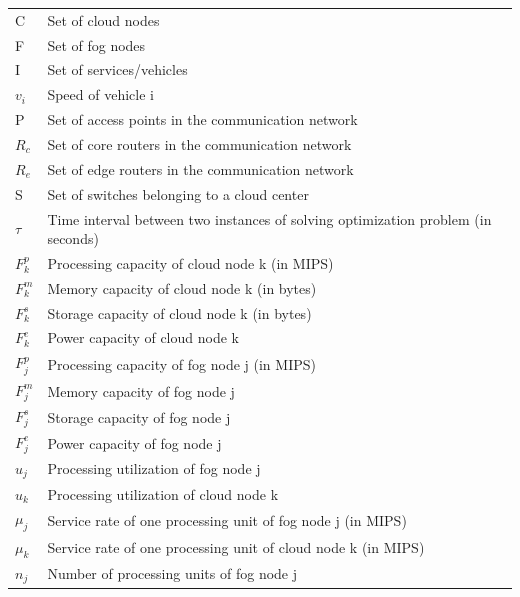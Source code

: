\documentclass[twocolumn]{article}
\begin{document}
\tablelasttail{\hline}
\label{tab:notation}
\scriptsize
\begin{supertabular}{|p{1.3cm}p{5.8cm}|}
\hline
    C&Set of cloud nodes\\
    F&Set of fog nodes\\
    I&Set of services/vehicles\\
    $v_{i}$&Speed of vehicle i\\
    P&Set of access points in the communication network\\
    $R_{c}$&Set of core routers in the communication network\\
    $R_{e}$&Set of edge routers in the communication network\\
    S&Set of switches belonging to a cloud center\\
    $\tau$&Time interval between two instances of solving optimization
problem (in seconds)\\
\hline
    $F^{p}_{k}$&Processing capacity of cloud node k (in MIPS)\\
    $F^{m}_{k}$&Memory capacity of cloud node k (in bytes)\\
    $F^{s}_{k}$&Storage capacity of cloud node k (in bytes)\\
    $F^{e}_{k}$&Power capacity of cloud node k\\
    $F^{p}_{j}$&Processing capacity of fog node j (in MIPS)\\
    $F^{m}_{j}$&Memory capacity of fog node j\\
    $F^{s}_{j}$&Storage capacity of fog node j\\
    $F^{e}_{j}$&Power capacity of fog node j\\
	$u_{j}$ &Processing utilization of fog node j\\
	$u_{k}$ &Processing utilization of cloud node k\\
    $\mu_{j}$&Service rate of one processing unit of fog node j (in MIPS)\\
    $\mu_{k}$&Service rate of one processing unit of cloud node k (in MIPS)\\
    $n_{j}$&Number of processing units of fog node j\\

\end{supertabular}
\end{document}
